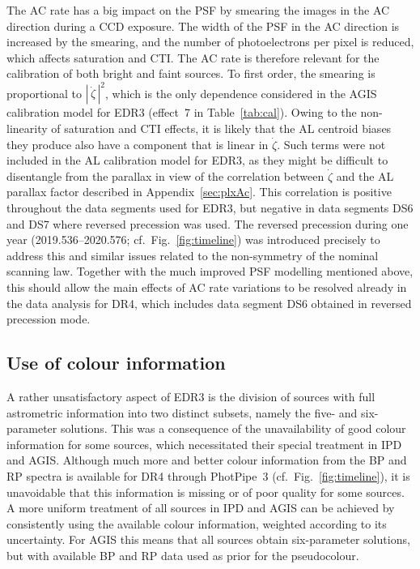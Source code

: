 \documentclass[longauth]{aa} %
\begin{document}
The AC rate has a big impact on the PSF by smearing the images in the AC direction during a 
CCD exposure. The width of the PSF in the AC direction is increased by the smearing, and the 
number of photoelectrons per pixel is reduced, which affects saturation and CTI. The AC rate is 
therefore relevant for the calibration of both bright and faint sources. To first order, the smearing 
is proportional to $|\,\dot{\zeta}\,|^2$, which is the only dependence considered in the AGIS calibration 
model for EDR3 (effect~7 in Table~\ref{tab:cal}). Owing to the non-linearity of saturation and CTI 
effects, it is likely that the AL centroid biases they produce also have a component that is linear in
$\dot{\zeta}$. Such terms were not included in the AL calibration model for EDR3, as they might 
be difficult to disentangle from the parallax in view of the correlation between $\dot{\zeta}$ and 
the AL parallax factor described in Appendix~\ref{sec:plxAc}. This correlation is positive throughout 
the data segments used for EDR3, but negative in data segments DS6 and DS7 where reversed 
precession was used. The reversed precession during one year (2019.536--2020.576; 
cf.\ Fig.~\ref{fig:timeline}) was introduced precisely to address this and similar issues related 
to the non-symmetry of the nominal scanning law. Together with the much improved 
PSF modelling mentioned above, this should allow the main effects of AC rate variations to 
be resolved already in the data analysis for DR4, which includes data segment DS6 obtained 
in reversed precession mode.

\subsection{Use of colour information}

A rather unsatisfactory aspect of EDR3 is the division of sources with full astrometric information 
into two distinct subsets, namely the five- and six-parameter solutions. This was a consequence
of the unavailability of good colour information for some sources, which necessitated
their special treatment in IPD and AGIS. Although much more and better colour information
from the BP and RP spectra is available for DR4 through PhotPipe~3 (cf.\ Fig.~\ref{fig:timeline}), 
it is unavoidable that this information is missing or of poor quality for some sources. A more uniform 
treatment of all sources in IPD and AGIS can be achieved by consistently using the available
colour information, weighted according to its uncertainty. For AGIS this means that all 
sources obtain six-parameter solutions, but with available BP and RP data used as prior for the 
pseudocolour. 
\end{document}

